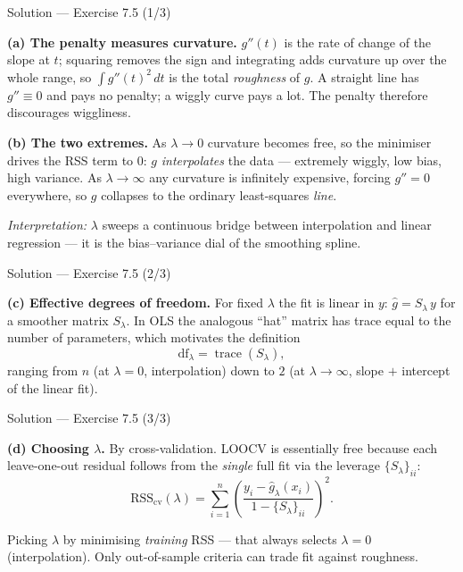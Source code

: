 \documentclass[aspectratio=169,11pt]{beamer}
\begin{document}
\begin{frame}{Solution --- Exercise 7.5 (1/3)}
\begin{solutionbox}
\textbf{(a) The penalty measures curvature.} $g''(t)$ is the rate of change of the slope at $t$; squaring removes the sign and integrating adds curvature up over the whole range, so $\int g''(t)^2\,dt$ is the total \emph{roughness} of $g$. A straight line has $g''\equiv0$ and pays no penalty; a wiggly curve pays a lot. The penalty therefore discourages wiggliness.

\medskip
\textbf{(b) The two extremes.} As $\lambda\to 0$ curvature becomes free, so the minimiser drives the RSS term to $0$: $g$ \emph{interpolates} the data --- extremely wiggly, low bias, high variance. As $\lambda\to\infty$ any curvature is infinitely expensive, forcing $g''=0$ everywhere, so $g$ collapses to the ordinary least-squares \emph{line}.

\medskip
\emph{Interpretation:} $\lambda$ sweeps a continuous bridge between interpolation and linear regression --- it is the bias--variance dial of the smoothing spline.
\end{solutionbox}
\end{frame}

\begin{frame}{Solution --- Exercise 7.5 (2/3)}
\begin{solutionbox}
\textbf{(c) Effective degrees of freedom.} For fixed $\lambda$ the fit is linear in $y$: $\hat g=S_\lambda\,y$ for a smoother matrix $S_\lambda$. In OLS the analogous ``hat'' matrix has trace equal to the number of parameters, which motivates the definition
\[ \mathrm{df}_\lambda=\operatorname{trace}(S_\lambda), \]
ranging from $n$ (at $\lambda=0$, interpolation) down to $2$ (at $\lambda\to\infty$, slope $+$ intercept of the linear fit).
\end{solutionbox}
\end{frame}

\begin{frame}{Solution --- Exercise 7.5 (3/3)}
\begin{solutionbox}
\medskip
\textbf{(d) Choosing $\lambda$.} By cross-validation. LOOCV is essentially free because each leave-one-out residual follows from the \emph{single} full fit via the leverage $\{S_\lambda\}_{ii}$:
\[ \mathrm{RSS}_{\text{cv}}(\lambda)=\sum_{i=1}^n\!\left(\frac{y_i-\hat g_\lambda(x_i)}{1-\{S_\lambda\}_{ii}}\right)^{\!2}. \]
\end{solutionbox}
\begin{mistake}
Picking $\lambda$ by minimising \emph{training} RSS --- that always selects $\lambda=0$ (interpolation). Only out-of-sample criteria can trade fit against roughness.
\end{mistake}
\end{frame}
\end{document}
